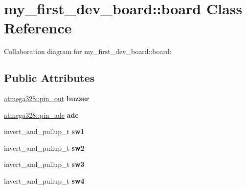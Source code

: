 \hypertarget{classmy__first__dev__board_1_1board}{}\section{my\+\_\+first\+\_\+dev\+\_\+board\+:\+:board Class Reference}
\label{classmy__first__dev__board_1_1board}


Collaboration diagram for my\+\_\+first\+\_\+dev\+\_\+board\+:\+:board\+:
\subsection*{Public Attributes}
\begin{DoxyCompactItemize}
\item 
\mbox{\label{classmy__first__dev__board_1_1board_a36dacc625c5bf214bc412d672e4cdb1e}} 
\hyperlink{classatmega328_1_1pin__out}{atmega328\+::pin\+\_\+out} {\bfseries buzzer}
\item 
\mbox{\label{classmy__first__dev__board_1_1board_a0c5fee60fe28e6c31e6b1f83070f9e77}} 
\hyperlink{classatmega328_1_1pin__adc}{atmega328\+::pin\+\_\+adc} {\bfseries adc}
\item 
\mbox{\label{classmy__first__dev__board_1_1board_a990358fbf03ade84be6c58712dec2ea8}} 
invert\+\_\+and\+\_\+pullup\+\_\+t {\bfseries sw1}
\item 
\mbox{\label{classmy__first__dev__board_1_1board_a7e0f642b7a6b11646a26f513592ad542}} 
invert\+\_\+and\+\_\+pullup\+\_\+t {\bfseries sw2}
\item 
\mbox{\label{classmy__first__dev__board_1_1board_aa07f24254a1f07ca15836226556d754d}} 
invert\+\_\+and\+\_\+pullup\+\_\+t {\bfseries sw3}
\item 
\mbox{\label{classmy__first__dev__board_1_1board_a62b85ad8b865523583cb703ea6ed82ef}} 
invert\+\_\+and\+\_\+pullup\+\_\+t {\bfseries sw4}
\item 
\mbox{\label{classmy__first__dev__board_1_1board_a0de1e6308cb6dbb97cbb3b8fb2bf2ec4}} 

\end{DoxyCompactItemize}
